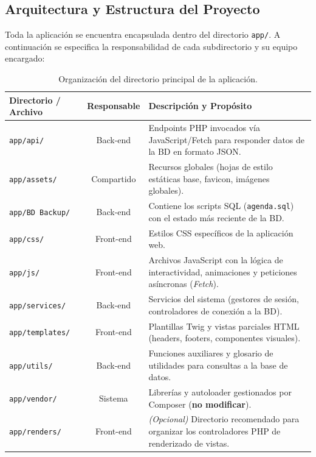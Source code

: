 \newpage
\subsection{Arquitectura y Estructura del Proyecto}

Toda la aplicación se encuentra encapsulada dentro del directorio \texttt{app/}. A continuación se especifica la responsabilidad de cada subdirectorio y su equipo encargado:

\begin{table}[H]
\centering
\small
{}
\begin{tabularx}{\textwidth}{l c X}
\toprule
\rowcolor{azulPastelApagado}
\textbf{\color{textoOscuro}Directorio / Archivo} & \textbf{\color{textoOscuro}Responsable} & \textbf{\color{textoOscuro}Descripción y Propósito} \\
\midrule
\texttt{app/api/} & Back-end & Endpoints PHP invocados vía JavaScript/Fetch para responder datos de la BD en formato JSON. \\
\texttt{app/assets/} & Compartido & Recursos globales (hojas de estilo estáticas base, favicon, imágenes globales). \\
\texttt{app/BD Backup/} & Back-end & Contiene los scripts SQL (\texttt{agenda.sql}) con el estado más reciente de la BD. \\
\texttt{app/css/} & Front-end & Estilos CSS específicos de la aplicación web. \\
\texttt{app/js/} & Front-end & Archivos JavaScript con la lógica de interactividad, animaciones y peticiones asíncronas (\textit{Fetch}). \\
\texttt{app/services/} & Back-end & Servicios del sistema (gestores de sesión, controladores de conexión a la BD). \\
\texttt{app/templates/} & Front-end & Plantillas Twig y vistas parciales HTML (headers, footers, componentes visuales). \\
\texttt{app/utils/} & Back-end & Funciones auxiliares y glosario de utilidades para consultas a la base de datos. \\
\texttt{app/vendor/} & Sistema & Librerías y autoloader gestionados por Composer (\textbf{no modificar}). \\
\texttt{app/renders/} & Front-end & \textit{(Opcional)} Directorio recomendado para organizar los controladores PHP de renderizado de vistas. \\
\bottomrule
\end{tabularx}
\caption{Organización del directorio principal de la aplicación.}
\end{table}

